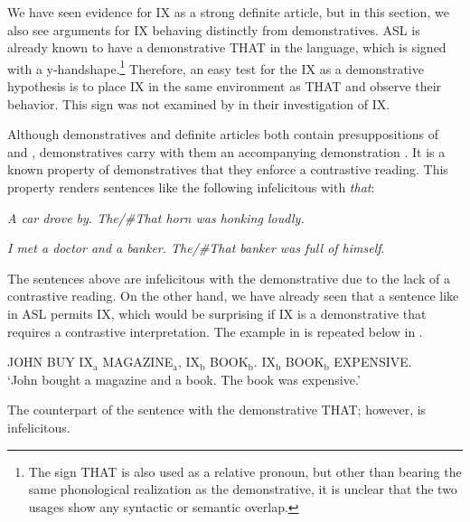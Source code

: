 \documentclass[output=paper,
modfonts
]{langscibook}
\begin{document}
We have seen evidence for IX as a strong definite article, but in this section, we also see arguments for IX behaving distinctly from demonstratives. ASL is already known to have a demonstrative THAT in the language, which is signed with a y-handshape.\footnote{The sign THAT is also used as a relative pronoun, but other than bearing the same phonological realization as the demonstrative, it is unclear that the two usages show any syntactic or semantic overlap.} Therefore, an easy test for the IX as a demonstrative hypothesis is to place IX in the same environment as THAT and observe their behavior. This sign was not examined by \citet{KoulidobrovaLilloMartin2016} in their investigation of IX. 

Although demonstratives and definite articles both contain presuppositions of  and , demonstratives carry with them an accompanying demonstration \citep{Roberts2002}. It is a known property of demonstratives that they enforce a contrastive reading. This property renders sentences like the following infelicitous with \textit{that}:

\begin{exe}
\ex\label{ex:irani:25} \textit{A car drove by. The\textnormal{/}\textnormal{\#}That horn was honking loudly.} \citep[70]{Wolter2006}

\ex\label{ex:irani:26} \textit{I met a doctor and a banker. The\textnormal{/}\textnormal{\#}That banker was full of himself}.
\end{exe} 

The sentences above are infelicitous with the demonstrative due to the lack of a contrastive reading. On the other hand, we have already seen that a sentence like  in ASL permits IX, which would be surprising if IX is a demonstrative that requires a contrastive interpretation. The example in  is repeated below in . 

\begin{exe}
\ex \label{ex:irani:27} JOHN BUY IX$_\text{a}$ MAGAZINE$_\text{a}$, IX$_\text{b}$ BOOK$_\text{b}$. IX$_\text{b}$ BOOK$_\text{b}$ EXPENSIVE.\\
`John bought a magazine and a book. The book was expensive.'
\end{exe}

\noindent The counterpart of the sentence with the demonstrative THAT; however, is infelicitous. 
\end{document}
